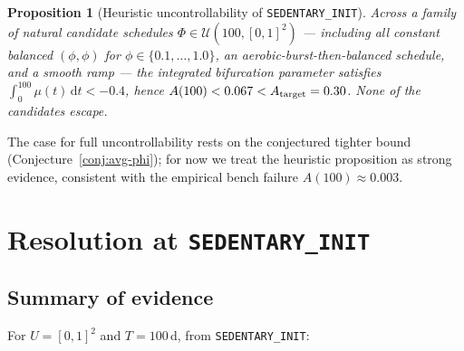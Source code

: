 \documentclass[11pt,a4paper]{article}
\newtheorem{proposition}[theorem]{Proposition}
\theoremstyle{definition}
\newcommand{\dd}{\,\mathrm{d}}
\begin{document}
\begin{proposition}[Heuristic uncontrollability of \texttt{SEDENTARY\_INIT}]\label{prop:heuristic}
Across a family of natural candidate schedules $\Phi \in \mathcal{U}(100, [0,1]^2)$ — including all constant balanced $(\phi, \phi)$ for $\phi \in \{0.1, \ldots, 1.0\}$, an aerobic-burst-then-balanced schedule, and a smooth ramp — the integrated bifurcation parameter satisfies $\int_0^{100} \mu(t)\dd t < -0.4$, hence $A(100) < 0.067 < A_{\rm target} = 0.30$. None of the candidates escape.
\end{proposition}

The case for full uncontrollability rests on the conjectured tighter bound (Conjecture~\ref{conj:avg-phi}); for now we treat the heuristic proposition as strong evidence, consistent with the empirical bench failure $A(100) \approx 0.003$.

\section{Resolution at \texttt{SEDENTARY\_INIT}} \label{sec:resolution}

\subsection{Summary of evidence}

For $U = [0,1]^2$ and $T = 100$\,d, from \texttt{SEDENTARY\_INIT}:
\end{document}
